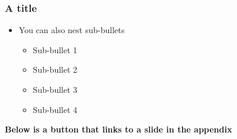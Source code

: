 \begin{frame}
    \label{Test} %
    \frametitle{A title}

    \begin{itemize}
        \item You can also nest sub-bullets
              \begin{itemize}
                  \item Sub-bullet 1
                  \item Sub-bullet 2
                  \item Sub-bullet 3
                  \item Sub-bullet 4 \newline
              \end{itemize}
    \end{itemize}

    \textbf{Below is a button that links to a slide in the appendix}

    \begin{center}
        \hyperlink{Figure}{}
    \end{center}
\end{frame}